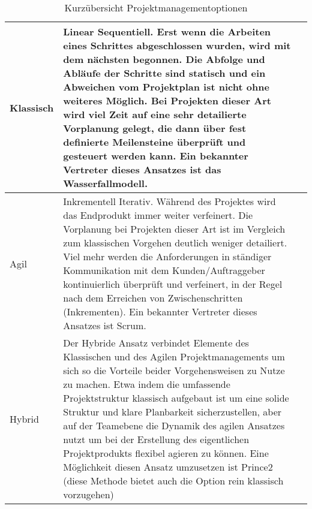 \begin{table}[ht]
    \centering
    \begin{tabularx}{\textwidth}{|l|X|X|} 
        \hline
        Klassisch & Linear Sequentiell. Erst wenn die Arbeiten eines Schrittes abgeschlossen wurden, wird mit dem nächsten begonnen. Die Abfolge und Abläufe der Schritte sind statisch und ein Abweichen vom Projektplan ist nicht ohne weiteres Möglich. Bei Projekten dieser Art wird viel Zeit auf eine sehr detailierte Vorplanung gelegt, die dann über fest definierte Meilensteine überprüft und gesteuert werden kann. Ein bekannter Vertreter dieses Ansatzes ist das Wasserfallmodell. \\
        \hline
        Agil & Inkrementell Iterativ. Während des Projektes wird das Endprodukt immer weiter verfeinert. Die Vorplanung bei Projekten dieser Art ist im Vergleich zum klassischen Vorgehen deutlich weniger detailiert. Viel mehr werden die Anforderungen in ständiger Kommunikation mit dem Kunden/Auftraggeber kontinuierlich überprüft und verfeinert, in der Regel nach dem Erreichen von Zwischenschritten (Inkrementen).  Ein bekannter Vertreter dieses Ansatzes ist Scrum. \\
        \hline
        Hybrid & Der Hybride Ansatz verbindet Elemente des Klassischen und des Agilen Projektmanagements um sich so die Vorteile beider Vorgehensweisen zu Nutze zu machen. Etwa indem die umfassende Projektstruktur klassisch aufgebaut ist um eine solide Struktur und klare Planbarkeit sicherzustellen, aber auf der Teamebene die Dynamik des 			agilen Ansatzes nutzt um bei der Erstellung des eigentlichen Projektprodukts flexibel agieren zu können. Eine Möglichkeit diesen Ansatz umzusetzen ist Prince2 (diese Methode bietet auch die Option rein klassisch vorzugehen)\\
        \hline
    \end{tabularx}
    \caption{Kurzübersicht Projektmanagementoptionen}
    \label{tab:pmOptionen}
\end{table}


